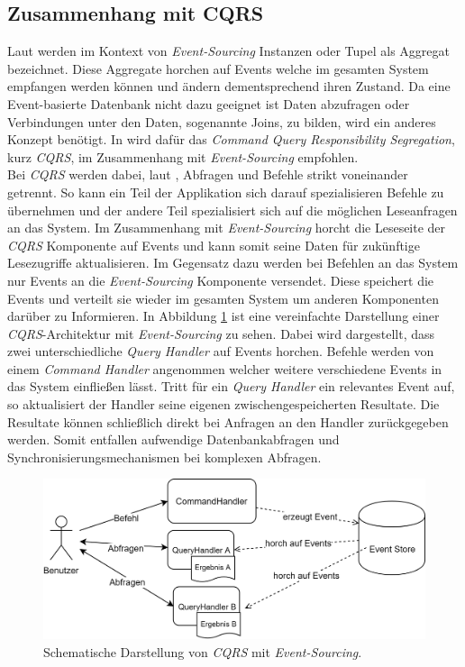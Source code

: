 \subsection{Zusammenhang mit CQRS}
\label{sub:transaction:cqrs}
Laut \cite{vernon2013implementing} werden im Kontext von \textit{Event-Sourcing} Instanzen oder Tupel als Aggregat bezeichnet. Diese Aggregate horchen auf Events welche im gesamten System empfangen werden können und ändern dementsprechend ihren Zustand. Da eine Event-basierte Datenbank nicht dazu geeignet ist Daten abzufragen oder Verbindungen unter den Daten, sogenannte Joins, zu bilden, wird ein anderes Konzept benötigt. In \cite{vernon2013implementing} wird dafür das \textit{Command Query Responsibility Segregation}, kurz \textit{CQRS}, im Zusammenhang mit \textit{Event-Sourcing} empfohlen. \\
Bei \textit{CQRS} werden dabei, laut \cite{cqrsYoung2010}, Abfragen und Befehle strikt voneinander getrennt. So kann ein Teil der Applikation sich darauf spezialisieren Befehle zu übernehmen und der andere Teil spezialisiert sich auf die möglichen Leseanfragen an das System. Im Zusammenhang mit \textit{Event-Sourcing} horcht die Leseseite der \textit{CQRS} Komponente auf Events und kann somit seine Daten für zukünftige Lesezugriffe aktualisieren. Im Gegensatz dazu werden bei Befehlen an das System nur Events an die \textit{Event-Sourcing} Komponente versendet. Diese speichert die Events und verteilt sie wieder im gesamten System um anderen Komponenten darüber zu Informieren. In Abbildung \ref{fig:transactionTheory:eventSourcing:cqrs} ist eine vereinfachte Darstellung einer \textit{CQRS}-Architektur mit \textit{Event-Sourcing} zu sehen. Dabei wird dargestellt, dass zwei unterschiedliche \textit{Query Handler} auf Events horchen. Befehle werden von einem \textit{Command Handler} angenommen welcher weitere verschiedene Events in das System einfließen lässt. Tritt für ein \textit{Query Handler} ein relevantes Event auf, so aktualisiert der Handler seine eigenen zwischengespeicherten Resultate. Die Resultate können schließlich direkt bei Anfragen an den Handler zurückgegeben werden. Somit entfallen aufwendige Datenbankabfragen und Synchronisierungsmechanismen bei komplexen Abfragen. \\

\begin{figure}
  \centering
  \includegraphics[width=\linewidth]{gfx/other/eventSourcingCqrs}
  \caption{Schematische Darstellung von \textit{CQRS} mit \textit{Event-Sourcing}.}
  \label{fig:transactionTheory:eventSourcing:cqrs}
\end{figure}

